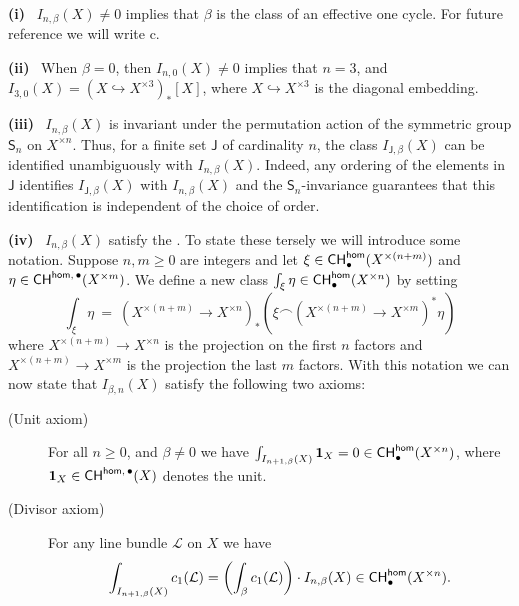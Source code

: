 \documentclass[twoside,leqno]{article}
\numberwithin{equation}{section}
\theoremstyle{plain}
\theoremstyle{definition}
\begin{document}
\medskip
  
 \ 


\medskip

\noindent
{\bfseries (i)} \ $I_{n,\beta}(X) \neq 0$ implies that $\beta$ is the class of an effective one cycle.
For future reference we will write c.

\medskip


\noindent
{\bfseries (ii)} \ When $\beta = 0$, then $I_{n,0}(X) \neq 0$ implies that $n = 3$, and  $I_{3,0}(X) = 
(X \hookrightarrow X^{\times 3})_{*}[X]$, where $X \hookrightarrow X^{\times 3}$ is the diagonal embedding.



\medskip

\noindent
{\bfseries (iii)} \ $I_{n,\beta}(X)$ is invariant under the permutation action of the symmetric group $\mathsf{S}_{n}$ on $X^{\times n}$. 
Thus, for a finite set $\mathsf{J}$ of cardinality $n$,  the class $I_{\mathsf{J},\beta}(X)$ can be identified unambiguously  with  $I_{n,\beta}(X)$. Indeed,  any ordering of the elements in $\mathsf{J}$ identifies $I_{\mathsf{J},\beta}(X)$ with $I_{n,\beta}(X)$ and the $\mathsf{S}_{n}$-invariance guarantees that this identification is independent of the choice of order.

\medskip

\noindent
{\bfseries (iv)} \ $I_{n,\beta}(X)$ satisfy the . To state these tersely we will introduce some notation. Suppose $n, m \geq 0$ are integers and let $\xi \in \mathsf{CH}^{\mathsf{hom}}_{\bullet}(X^{\times(n+m)})$ and $\eta \in \mathsf{CH}^{\mathsf{hom}, \, \bullet}(X^{\times m})$. We define a new class $\int_{\xi} \eta \in \mathsf{CH}^{\mathsf{hom}}_{\bullet}(X^{\times n})$ by setting
\[
\int_{\xi} \eta \  = \ \left(X^{\times (n+m)} \to X^{\times n}\right)_{*} \left(\xi \frown \left(X^{\times (n+m)} \to X^{\times m}\right)^{*} \eta\right) 
\]
where $X^{\times (n+m)} \to X^{\times n}$ is the projection on the first $n$ factors and 
$X^{\times (n+m)} \to X^{\times m}$ is the projection the last $m$ factors. With this notation we can now state that $I_{\beta,n}(X)$ satisfy the following two axioms:
\begin{description}
\item[(Unit axiom)] For all $n \geq 0$, and $\beta \neq 0$ we have $\int_{I_{n+1,\beta}(X)} \mathbf{1}_{X} = 0 \in \mathsf{CH}^{\mathsf{hom}}_{\bullet}(X^{\times n})$, where $\mathbf{1}_{X} \in \mathsf{CH}^{\mathsf{hom}, \, 
\bullet}(X)$ denotes  the unit. 
\item[(Divisor axiom)] For any line bundle $\mathcal{L}$ on $X$ we have
\[
\int_{I_{n+1,\beta}(X)} c_{1}(\mathcal{L}) = \left( \int_{\beta} c_{1}(\mathcal{L})\right)\cdot I_{n,\beta}(X) \in \mathsf{CH}^{\mathsf{hom}}_{\bullet}(X^{\times n}).
\]
\end{description}
\end{document}
